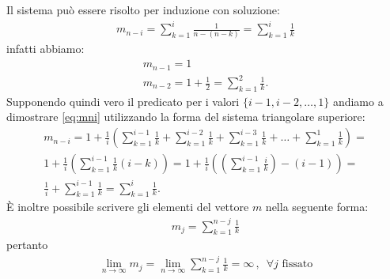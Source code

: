 \documentclass[12pt]{homework}
\begin{document}
Il sistema può essere risolto per induzione con soluzione:
\begin{gather} \label{eq:mni}
  m_{n-i} =  \sum \limits_{k=1}^{i} \frac{1}{n-(n-k)} =  \sum \limits_{k=1}^{i} \frac{1}{k}
\end{gather}
infatti abbiamo:
\begin{gather*}
m_{n-1} = 1\\
m_{n-2}=1+\frac{1}{2}=\sum_{k=1}^{2}\frac{1}{k}.
\end{gather*} 
Supponendo quindi vero il predicato per i valori \(\{i-1, i-2, \dots , 1\}\) andiamo a dimostrare \ref{eq:mni} utilizzando la forma del sistema triangolare superiore:
\begin{gather*}
  m_{n-i} = 1 + \frac{1}{i}\left( \sum \limits_{k=1}^{i-1}\frac{1}{k} + \sum \limits_{k=1}^{i-2}\frac{1}{k} + \sum \limits_{k=1}^{i-3}\frac{1}{k} + \dots + \sum \limits_{k=1}^{1}\frac{1}{k} \right) = \\
  1 + \frac{1}{i}\left(\sum \limits_{k=1}^{i-1}\frac{1}{k}(i-k)\right) = 1 + \frac{1}{i}\left( \left(\sum \limits_{k=1}^{i-1}\frac{i}{k}\right)- (i-1)\right) = \\
   \frac{1}{i} +\sum \limits_{k=1}^{i-1}\frac{1}{k} = \sum \limits_{k=1}^{i}\frac{1}{k}.
\end{gather*}
È inoltre possibile scrivere gli elementi del vettore \(m\) nella seguente forma:
\begin{gather*}
  m_j = \sum \limits_{k=1}^{n-j}\frac{1}{k}
\end{gather*}
pertanto 
\begin{gather*}
  \lim \limits_{n \rightarrow \infty} m_j = \lim \limits_{n \rightarrow \infty} \sum \limits_{k=1}^{n-j}\frac{1}{k} = \infty \,,\,\,\, \forall j \text{ fissato}
\end{gather*}





\newpage
\end{document}
